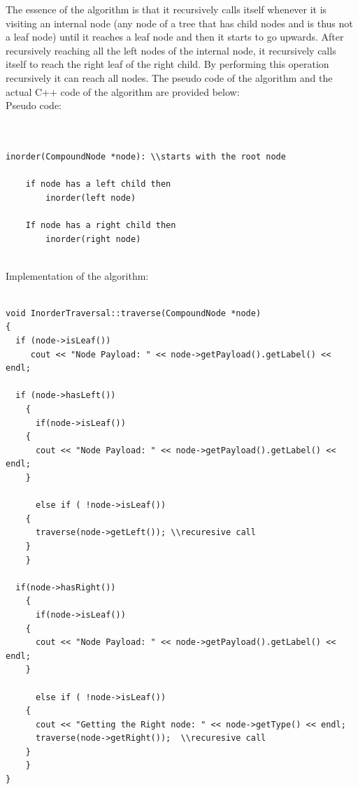 \documentclass[10pt, a4paper, titlepage]{article}
\begin{document}
The essence of the algorithm is that it recursively calls itself whenever it is visiting an internal node (any node of a tree that has child nodes and is thus not a leaf node) until it reaches a leaf node and then it starts to go upwards. After recursively reaching all the left nodes of the internal node, it recursively calls itself to reach the right leaf of the right child. By performing this operation recursively it can reach all nodes. The pseudo code of the algorithm and the actual C++ code of the algorithm are provided below:\\

Pseudo code:\\\\
\small
\begin{lstlisting}

inorder(CompoundNode *node): \\starts with the root node

	if node has a left child then
		inorder(left node)
		
	If node has a right child then
		inorder(right node)
				
\end{lstlisting}
\large
Implementation of the algorithm:\\\\

\small
\begin{lstlisting}
void InorderTraversal::traverse(CompoundNode *node)
{
  if (node->isLeaf())
	 cout << "Node Payload: " << node->getPayload().getLabel() << endl;
	 
  if (node->hasLeft())
    {
      if(node->isLeaf())
	{
	  cout << "Node Payload: " << node->getPayload().getLabel() << endl;
	}

      else if ( !node->isLeaf())
	{
	  traverse(node->getLeft()); \\recuresive call
	}
    }

  if(node->hasRight())
    {
      if(node->isLeaf())
	{
	  cout << "Node Payload: " << node->getPayload().getLabel() << endl;
	}

      else if ( !node->isLeaf())
	{
	  cout << "Getting the Right node: " << node->getType() << endl;
	  traverse(node->getRight());  \\recuresive call
	}
    }
}
					
\end{lstlisting}
\large
\end{document}

